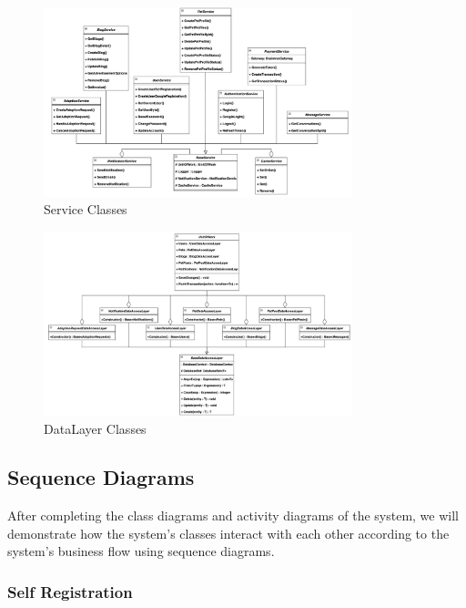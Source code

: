 \begin{figure}[H]
  \centering
  \includegraphics[angle=-90,width=0.8\textwidth]{Figures/service_class.png}
  \caption{Service Classes}
  \label{fig:service-classes}
\end{figure}

\begin{figure}[H]
  \centering
  \includegraphics[angle=-90,width=0.8\textwidth]{Figures/uow_class.png}
  \caption{DataLayer Classes}
  \label{fig:datalayer-classes}
\end{figure}
\clearpage

\subsection{Sequence Diagrams}

After completing the class diagrams and activity diagrams of the system, we will  demonstrate how the system's classes interact with each other according to the system's business flow using sequence diagrams.

\subsubsection{Self Registration}

